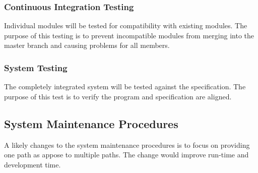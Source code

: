 \documentclass[12pt]{article}
\begin{document}
    \subsubsection{Continuous Integration Testing}
    Individual modules will be tested for compatibility with existing modules. The purpose of this testing is to prevent incompatible modules from merging into the master branch and causing problems for all members.
    
    \subsubsection{System Testing}
    The completely integrated system will be tested against the specification. The purpose of this test is to verify the program and specification are aligned.

\subsection{System Maintenance Procedures}
A likely changes to the system maintenance procedures is to focus on providing one path as appose to multiple paths. The change would improve run-time and development time.
\end{document}
